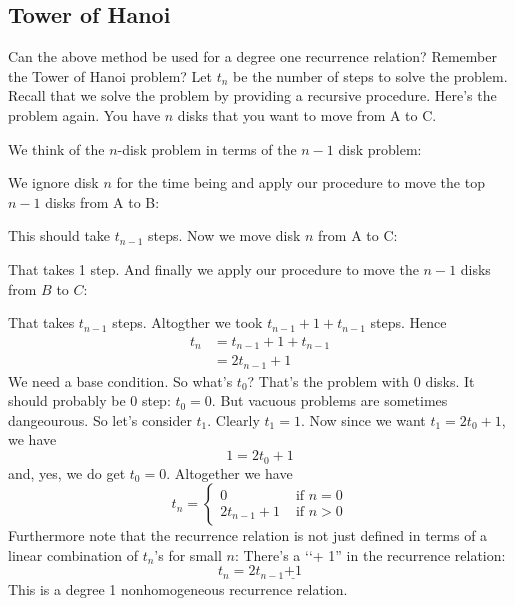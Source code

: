 \subsection{Tower of Hanoi}

Can the above method be used for a degree one recurrence relation?
Remember the Tower of Hanoi problem?
Let $t_n$ be the number of steps to solve the problem.
Recall that we solve the problem by providing
a recursive procedure.
Here's the problem again.
You have $n$ disks that you want to move from A to C.



We think of the $n$-disk problem in terms of the
$n-1$ disk problem:



We ignore disk $n$ for the time being
and apply our procedure to move the top $n-1$ disks from A to B:



This should take $t_{n-1}$ steps.
Now we move disk $n$ from A to C:



That takes 1 step.
And finally we apply our procedure to move
the $n-1$ disks from $B$ to $C$:



That takes $t_{n-1}$ steps.
Altogther we took $t_{n-1} + 1 + t_{n-1}$ steps.
Hence
\begin{align*}
t_n 
&= t_{n-1} + 1 + t_{n-1} \\
&= 2 t_{n-1} + 1
\end{align*}
We need a base condition.
So what's $t_0$?
That's the problem with $0$ disks.
It should probably be 0 step: $t_0 = 0$.
But vacuous problems are sometimes dangeourous.
So let's consider $t_1$.
Clearly $t_1 = 1$.
Now since we want $t_1 = 2t_0 + 1$, we have
\[
1 = 2 t_0 + 1
\]
and, yes, we do get $t_0 = 0$.
Altogether we have
\[
t_n = 
\begin{cases}
0 &\text{ if } n = 0 \\
2 t_{n-1} + 1 &\text{ if } n > 0
\end{cases}
\]
Furthermore note that the recurrence relation is not just defined
in terms of a linear combination of $t_n$'s for small $n$:
There's a \lq\lq + 1'' in the recurrence relation:
\[
t_n = 2 t_{n-1} \underline{ + 1 }
\]
This is a degree 1 nonhomogeneous recurrence relation.

